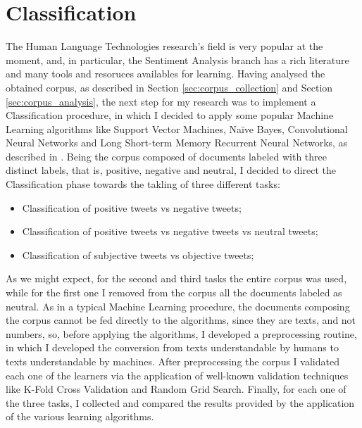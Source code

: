 \documentclass[11pt,twocolumn]{article}
\begin{document}
    \section{Classification} %
    \label{sec:classification}
        The Human Language Technologies research's field is very popular at the moment, and, in particular, the
        Sentiment Analysis branch has a rich literature and many tools and resoruces availables for learning.
        Having analysed the obtained corpus, as described in Section \ref{sec:corpus_collection} and Section
        \ref{sec:corpus_analysis}, the next step for my research was to implement a Classification procedure,
        in which I decided to apply some popular Machine Learning algorithms like Support Vector Machines,
        Naïve Bayes, Convolutional Neural Networks and Long Short-term Memory Recurrent Neural Networks, as
        described in \cite{semeval_2014,state_of_the_art,semeval_2016,esuli,attardi}. Being the corpus composed
        of documents labeled with three distinct labels, that is, positive, negative and neutral, I decided to
        direct the Classification phase towards the takling of three different tasks:

        \begin{itemize}
            \item Classification of positive tweets vs negative tweets;
            \item Classification of positive tweets vs negative tweets vs neutral tweets;
            \item Classification of subjective tweets vs objective tweets;
        \end{itemize}

        \noindent
        As we might expect, for the second and third tasks the entire corpus was used, while for the first one
        I removed from the corpus all the documents labeled as neutral. As in a typical Machine Learning
        procedure, the documents composing the corpus cannot be fed directly to the algorithms, since they are
        texts, and not numbers, so, before applying the algorithms, I developed a preprocessing routine, in
        which I developed the conversion from texts understandable by humans to texts understandable by
        machines. After preprocessing the corpus I validated each one of the learners via the application of
        well-known validation techniques like K-Fold Cross Validation and Random Grid Search. Finally, for each
        one of the three tasks, I collected and compared the results provided by the application of the
        various learning algorithms.
\end{document}
